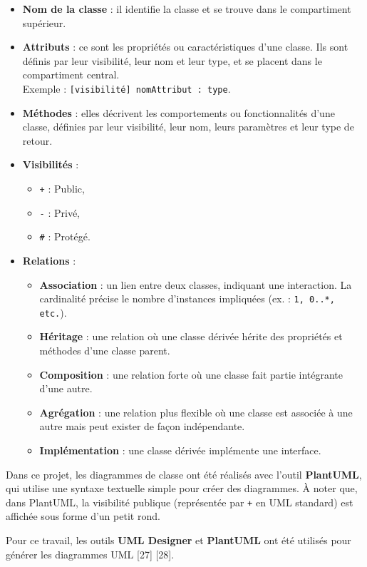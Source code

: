 \begin{itemize}
	\item \textbf{Nom de la classe} : il identifie la classe et se trouve dans le compartiment supérieur.
	\item \textbf{Attributs} : ce sont les propriétés ou caractéristiques d'une classe. Ils sont définis par leur visibilité, leur nom et leur type, et se placent dans le compartiment central. \\
	Exemple : \texttt{[visibilité] nomAttribut : type}.
	\item \textbf{Méthodes} : elles décrivent les comportements ou fonctionnalités d'une classe, définies par leur visibilité, leur nom, leurs paramètres et leur type de retour.
	\item \textbf{Visibilités} :
	\begin{itemize}
		\item \texttt{+} : Public,
		\item \texttt{-} : Privé,
		\item \texttt{\#} : Protégé.
	\end{itemize}
	\item \textbf{Relations} :
	\begin{itemize}
		\item \textbf{Association} : un lien entre deux classes, indiquant une interaction. La cardinalité précise le nombre d'instances impliquées (ex. : \texttt{1, 0..*, etc.}).
		\item \textbf{Héritage} : une relation où une classe dérivée hérite des propriétés et méthodes d'une classe parent.
		\item \textbf{Composition} : une relation forte où une classe fait partie intégrante d'une autre.
		\item \textbf{Agrégation} : une relation plus flexible où une classe est associée à une autre mais peut exister de façon indépendante.
		\item \textbf{Implémentation} : une classe dérivée implémente une interface.
	\end{itemize}
\end{itemize}

Dans ce projet, les diagrammes de classe ont été réalisés avec l'outil \textbf{PlantUML}, qui utilise une syntaxe textuelle simple pour créer des diagrammes. À noter que, dans PlantUML, la visibilité publique (représentée par \texttt{+} en UML standard) est affichée sous forme d'un petit rond.

Pour ce travail, les outils \textbf{UML Designer} et \textbf{PlantUML} ont été utilisés pour générer les diagrammes UML [27] [28].

